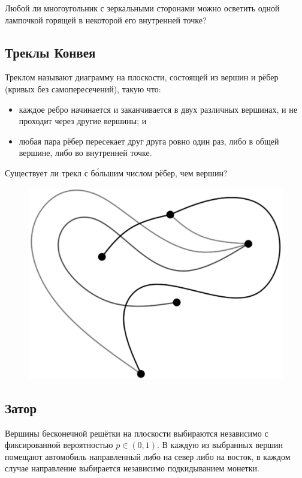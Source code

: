 Любой ли многоугольник с зеркальными сторонами можно осветить одной лампочкой горящей в некоторой его внутренней точке?

\subsection*{Треклы Конвея}

Треклом называют диаграмму на плоскости, состоящей из вершин и рёбер (кривых без самопересечений), такую что:
\begin{itemize}
\item каждое ребро начинается и заканчивается в двух различных вершинах, и не проходит через другие вершины; и
\item любая пара рёбер пересекает друг друга ровно один раз, либо в общей вершине, либо во внутренней точке.
\end{itemize}

Существует ли трекл с б\'{о}льшим числом рёбер, чем вершин?

\begin{figure}[h!]
\centering
\includegraphics[scale=0.5]{Figs/UnsolvedPuzzles/thrack}
\end{figure}

\subsection*{Затор}

Вершины бесконечной решётки на плоскости выбираются независимо с фиксированной вероятностью $p\in (0,1)$.
В каждую из выбранных вершин помещают автомобиль направленный либо на север либо на восток,
в каждом  случае направление выбирается независимо подкидыванием монетки.

